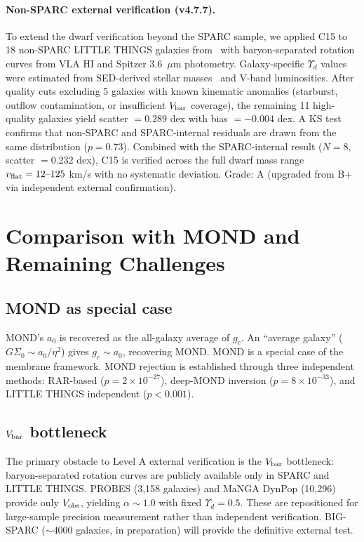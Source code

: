 \documentclass[11pt,a4paper]{article}
\newcommand{\e}[1]{\times 10^{#1}}
\newcommand{\gc}{g_{c}}
\newcommand{\ao}{a_{0}}
\newcommand{\vflat}{v_{\rm flat}}
\newcommand{\Yd}{\Upsilon_{d}}
\begin{document}
\paragraph{Non-SPARC external verification (v4.7.7).}
To extend the dwarf verification beyond the SPARC sample, we applied C15 to 18 non-SPARC LITTLE THINGS
galaxies from~\citet{Oh2015} with baryon-separated rotation curves from VLA HI and Spitzer 3.6~$\mu$m
photometry. Galaxy-specific $\Yd$ values were estimated from SED-derived stellar masses~\citep{Zhang2012}
and V-band luminosities. After quality cuts excluding 5 galaxies with known kinematic anomalies (starburst,
outflow contamination, or insufficient $V_{\rm bar}$ coverage), the remaining 11 high-quality galaxies yield
scatter $= 0.289$ dex with bias $= -0.004$ dex. A KS test confirms that non-SPARC and SPARC-internal
residuals are drawn from the same distribution ($p = 0.73$). Combined with the SPARC-internal result ($N =
8$, scatter $= 0.232$ dex), C15 is verified across the full dwarf mass range $\vflat = 12\text{--}125$ km/s
with no systematic deviation. Grade: A (upgraded from B$+$ via independent external confirmation).

\section{Comparison with MOND and Remaining Challenges}

\subsection{MOND as special case}
MOND's $\ao$ is recovered as the all-galaxy average of $\gc$. An ``average galaxy'' ($G\Sigma_0 \sim \ao/\eta^2$)
gives $\gc \sim \ao$, recovering MOND. MOND is a special case of the membrane framework. MOND rejection is
established through three independent methods: RAR-based ($p = 2\e{-27}$), deep-MOND inversion
($p = 8\e{-33}$), and LITTLE THINGS independent ($p < 0.001$).

\subsection{$V_{\rm bar}$ bottleneck}
The primary obstacle to Level A external verification is the $V_{\rm bar}$ bottleneck: baryon-separated
rotation curves are publicly available only in SPARC and LITTLE THINGS. PROBES (3{,}158 galaxies) and MaNGA
DynPop (10{,}296) provide only $V_{\rm obs}$, yielding $\alpha \sim 1.0$ with fixed $\Yd = 0.5$. These are
repositioned for large-sample precision measurement rather than independent verification. BIG-SPARC ($\sim
4000$ galaxies, in preparation) will provide the definitive external test.
\end{document}
